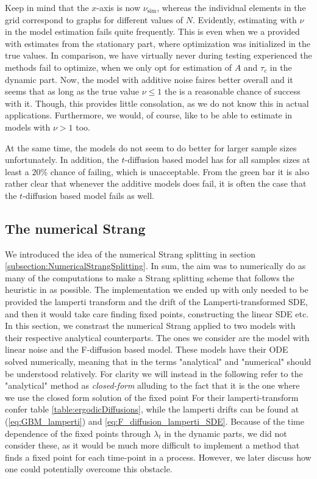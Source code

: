 Keep in mind that the $x$-axis is now $\nu_{\mathrm{sim}}$, whereas the individual elements in the grid correspond to graphs for different values of $N$. Evidently, estimating with $\nu$ in the model estimation fails quite frequently. This is even when we a provided with estimates from the stationary part, where optimization was initialized in the true values. In comparison, we have virtually never during testing experienced the methods fail to optimize, when we only opt for estimation of $A$ and $\tau_c$ in the dynamic part. Now, the model with additive noise faires better overall and it seems that as long as the true value $\nu\leq 1$ the is a reasonable chance of success with it. Though, this provides little consolation, as we do not know this in actual applications. Furthermore, we would, of course, like to be able to estimate in models with $\nu > 1$ too.

At the same time, the models do not seem to do better for larger sample sizes unfortunately. In addition, the $t$-diffusion based model has for all samples sizes at least a $20\%$ chance of failing, which is unacceptable. From the green bar it is also rather clear that whenever the additive models does fail, it is often the case that the $t$-diffusion based model fails as well.  
\subsection{The numerical Strang}
We introduced the idea of the numerical Strang splitting in section \ref{subsection:NumericalStrangSplitting}. In sum, the aim was to numerically do as many of the computations to make a Strang splitting scheme that follows the heuristic in \cite{SplittingSchemes} as possible. The implementation we ended up with only needed to be provided the lamperti transform and the drift of the Lamperti-transformed SDE, and then it would take care finding fixed points, constructing the linear SDE etc. In this section, we constrast the numerical Strang applied to two models with their respective analytical counterparts. The ones we consider are the model with linear noise and the F-diffusion based model. 
These models have their ODE solved numerically, meaning that in the terms "analytical" and "numerical" should be understood relatively. For clarity we will instead in the following refer to the "analytical" method as \textit{closed-form} alluding to the fact that it is the one where we use the closed form solution of the fixed point For their lamperti-transform confer table \ref{table:ergodicDiffusions}, while the lamperti drifts can be found at (\ref{eq:GBM_lamperti}) and \ref{eq:F_diffusion_lamperti_SDE}. Because of the time dependence of the fixed points through $\lambda_t$ in the dynamic parts, we did not consider these, as it would be much more difficult to implement a method that finds a fixed point for each time-point in a process. However, we later discuss how one could potentially overcome this obstacle.


